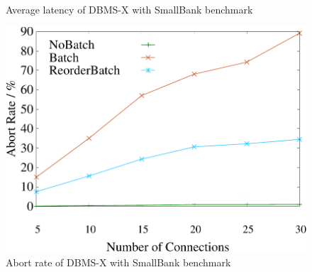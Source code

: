 \begin{figure}[t]
\begin{minipage}[b]{0.32\linewidth}
	\vspace{-2em}
	\caption{Average latency of DBMS-X with SmallBank benchmark}
	\label{fig:hekaton:latency}
	\end{minipage}
	\begin{minipage}[b]{0.32\linewidth}
	\centering
	\includegraphics[width=\textwidth]{./exp_fig/hekaton/hekaton_abort}
	\vspace{-2em}
	\caption{Abort rate of DBMS-X with SmallBank benchmark}
	\label{fig:hekaton:abort}
	\end{minipage}
\end{figure}

